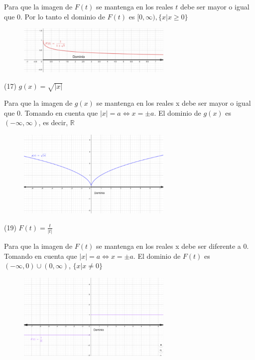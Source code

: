\documentclass[12pt, letterpaper]{article}
\begin{document}
Para que la imagen de $F(t)$ se mantenga en los reales $t$ debe ser mayor o igual que $0$. Por lo tanto el dominio de $F(t)$ es $[0, \infty), \{x|x\geq 0\}$
\begin{figure}[h]
\centering
\includegraphics[width=20em]{tres}
\end{figure} 

\newpage

(17) $g(x) = \sqrt{|x|}$

Para que la imagen de $g(x)$ se mantenga en los reales x debe ser mayor o igual que $0$. Tomando en cuenta que $|x| = a \iff x = \pm a $. El dominio de $g(x)$ es $(-\infty, \infty)$, es decir, $\mathbb{R}$

\begin{figure}[h]
\centering
\includegraphics[width=20em]{cuatro}
\end{figure} 

(19) $F(t) = \frac{t}{|t|}$

Para que la imagen de $F(t)$ se mantenga en los reales x debe ser diferente a $0$. Tomando en cuenta que $|x| = a \iff x = \pm a $. El dominio de $F(t)$ es $(-\infty, 0)\cup(0,\infty)$, $\{x|x\neq0\}$

\begin{figure}[h]
\centering
\includegraphics[width=20em]{cinco}
\end{figure} 

\newpage
\end{document}
